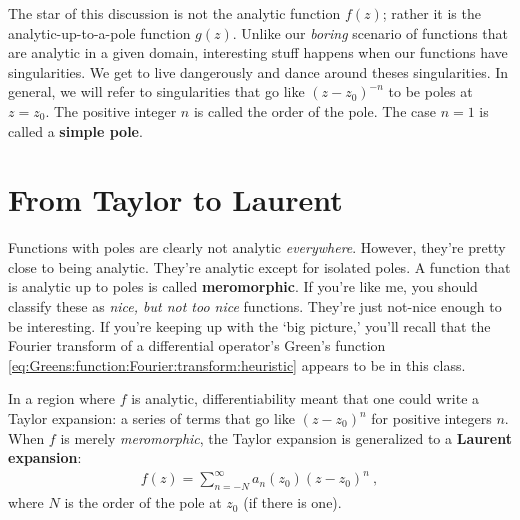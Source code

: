 The star of this discussion is not the analytic function $f(z)$; rather it is the analytic-up-to-a-pole function $g(z)$. Unlike our \emph{boring} scenario of functions that are analytic in a given domain, interesting stuff happens when our functions have singularities. We get to live dangerously and dance around theses singularities. In general, we will refer to singularities that go like $(z-z_0)^{-n}$ to be poles at $z=z_0$. The positive integer $n$ is called the order of the pole. The case $n=1$ is called a \textbf{simple pole}.

\section{From Taylor to Laurent}

Functions with poles are clearly not analytic \emph{everywhere}. However, they're pretty close to being analytic. They're analytic except for isolated poles. A function that is analytic up to poles is called \textbf{meromorphic}. If you're like me, you should classify these as \emph{nice, but not too nice} functions. They're just not-nice enough to be interesting. If you're keeping up with the `big picture,' you'll recall that the Fourier transform of a differential operator's Green's function  \eqref{eq:Greens:function:Fourier:transform:heuristic} appears to be in this class.

In a region where $f$ is analytic, differentiability meant that one could write a Taylor expansion: a series of terms that go like $(z-z_0)^n$ for positive integers $n$. When $f$ is merely \emph{meromorphic}, the Taylor expansion is generalized to a \textbf{Laurent expansion}:
\begin{align}
  f(z) = \sum_{n=-N}^\infty  a_n(z_0) (z-z_0)^n \ ,
\end{align}
where $N$ is the order of the pole at $z_0$ (if there is one). 

